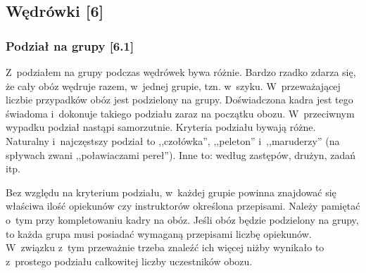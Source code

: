 \documentclass[a5paper,10pt,titlepage,twoside]{article}
\begin{document}
\subsection{Wędrówki [6]}
\subsubsection{Podział na grupy [6.1]}
Z~podziałem na grupy podczas wędrówek bywa różnie. Bardzo rzadko zdarza się, że cały obóz wędruje razem, w~jednej grupie, tzn. w~szyku. W~przeważającej liczbie przypadków obóz jest podzielony na grupy. Doświadczona kadra jest tego świadoma i~dokonuje takiego podziału zaraz na początku obozu. W~przeciwnym wypadku podział nastąpi samorzutnie. Kryteria podziału bywają różne. Naturalny i~najczęstszy podział to ,,czołówka'', ,,peleton'' i~,,maruderzy'' (na spływach zwani ,,poławiaczami pereł''). Inne to: według zastępów, drużyn, zadań itp.

Bez względu na kryterium podziału, w~każdej grupie powinna znajdować się właściwa ilość opiekunów czy instruktorów określona przepisami. Należy pamiętać o~tym przy kompletowaniu kadry na obóz. Jeśli obóz będzie podzielony na grupy, to każda grupa musi posiadać wymaganą przepisami liczbę opiekunów. W~związku z~tym przeważnie trzeba znaleźć ich więcej niżby wynikało to z~prostego podziału całkowitej liczby uczestników obozu.
\end{document}
